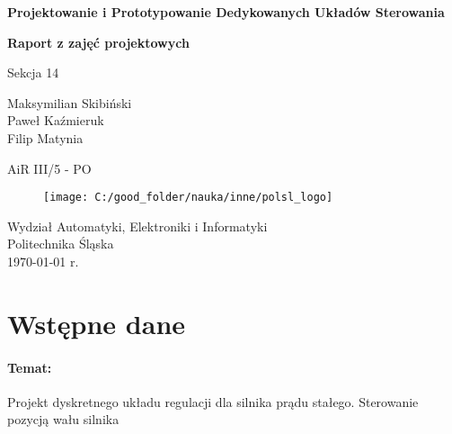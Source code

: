 \documentclass[11 pt]{article}
\begin{document}
\begin{titlepage}
	\begin{center}
		\textbf{\LARGE Projektowanie i Prototypowanie Dedykowanych Układów Sterowania}\\
		
		\vspace{0.5 cm}
		
		\textbf{\LARGE Raport z zajęć projektowych}\\
		
		\vspace{1.0 cm}
		
		{\Large Sekcja 14}
		
		\vspace{0.5 cm}
		
		{\large%
		Maksymilian Skibiński\\%
		Paweł Kaźmieruk\\%
		Filip Matynia%
		}
		
		\vspace{0.5 cm}
		
		{\large AiR III/5 - PO}\\

		\vspace{2.0 cm}
		
		\vfill
		
		\begin{figure}[h]
			\centering
			\texttt{[image: C:/good\_folder/nauka/inne/polsl\_logo]}
		\end{figure}
		
		\vspace{0.5 cm}
		
		Wydział Automatyki, Elektroniki i Informatyki\\
		Politechnika Śląska\\
		\today{} r.
	\end{center}
\end{titlepage}

\tableofcontents

\newpage

\section*{Wstępne dane}

\paragraph{Temat:} Projekt dyskretnego układu regulacji dla silnika prądu stałego. Sterowanie pozycją wału silnika
\end{document}
